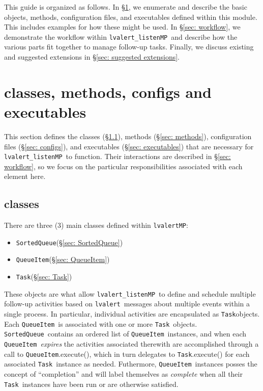 \documentclass{article}
\newcommand{\alert}{\texttt{lvalert}}
\newcommand{\lvalertMP}{\texttt{lvalertMP}}
\newcommand{\lvalertListenMP}{\texttt{lvalert\_listenMP}}
\newcommand{\SortedQueue}{\texttt{SortedQueue}}
\newcommand{\QueueItem}{\texttt{QueueItem}}
\newcommand{\Task}{\texttt{Task}}
\begin{document}
This guide is organized as follows. In \S\ref{sec: classes, methods, configs and executables}, we enumerate and describe the basic objects, methods, configuration files, and executables defined within this module. 
This includes examples for how these might be used.
In \S\ref{sec: workflow}, we demonstrate the workflow within \lvalertListenMP~and describe how the various parts fit together to manage follow-up tasks.
Finally, we discuss existing and suggested extensions in \S\ref{sec: suggested extensions}.


\section{classes, methods, configs and executables}
\label{sec: classes, methods, configs and executables}

This section defines the classes (\S\ref{sec: classes}), methods (\S\ref{sec: methods}), configuration files (\S\ref{sec: configs}), and executables (\S\ref{sec: executables}) that are necessary for \lvalertListenMP~to function. 
Their interactions are described in \S\ref{sec: workflow}, so we focus on the particular responsibilities associated with each element here.


\subsection{classes}
\label{sec: classes}

There are three (3) main classes defined within \lvalertMP:
\begin{itemize}
    \item{\SortedQueue (\S\ref{sec: SortedQueue})}
    \item{\QueueItem (\S\ref{sec: QueueItem})}
    \item{\Task (\S\ref{sec: Task})}
\end{itemize}
These objects are what allow \lvalertListenMP~to define and schedule multiple follow-up activities based on \alert~messages about multiple events within a single process.
In particular, individual activities are encapsulated as \Task objects.
Each \QueueItem~is associated with one or more \Task~objects.
\SortedQueue~contains an ordered list of \QueueItem~instances, and when each \QueueItem~\textit{expires} the activities associated therewith are accomplished through a call to \QueueItem.execute(), which in turn delegates to \Task.execute() for each associated \Task~instance as needed.
Futhermore, \QueueItem~instances posses the concept of ``completion'' and will label themselves as \textit{complete} when all their \Task~instances have been run or are otherwise satisfied.
\end{document}
